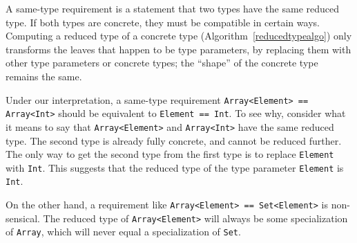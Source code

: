 \documentclass[a4paper,headsepline,bibliography=totoc,toc=flat,fleqn,twoside=semi]{scrbook}
\theoremstyle{definition}
\theoremstyle{definition}
\theoremstyle{definition}
\begin{document}
A same-type requirement is a statement that two types have the same reduced type. If both types are concrete, they must be compatible in certain ways. Computing a reduced type of a concrete type (Algorithm~\ref{reducedtypealgo}) only transforms the leaves that happen to be type parameters, by replacing them with other type parameters or concrete types; the ``shape'' of the concrete type remains the same.

Under our interpretation, a same-type requirement \texttt{Array<Element> == Array<Int>} should be equivalent to \texttt{Element == Int}. To see why, consider what it means to say that \texttt{Array<Element>} and \texttt{Array<Int>} have the same reduced type. The second type is already fully concrete, and cannot be reduced further. The only way to get the second type from the first type is to replace \texttt{Element} with \texttt{Int}. This suggests that the reduced type of the type parameter \texttt{Element} is \texttt{Int}.

On the other hand, a requirement like \texttt{Array<Element> == Set<Element>} is non-sensical. The reduced type of \texttt{Array<Element>} will always be some specialization of \texttt{Array}, which will never equal a specialization of \texttt{Set}.
\end{document}
